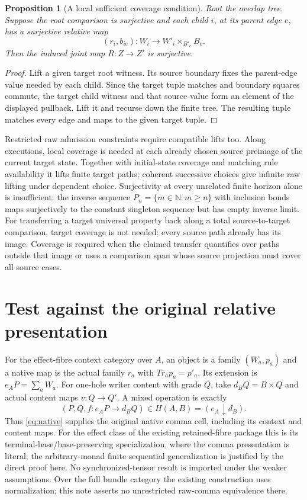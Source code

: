 \documentclass[11pt]{article}
\newtheorem{proposition}[theorem]{Proposition}
\begin{document}
\begin{proposition}[A local sufficient coverage condition]
Root the overlap tree. Suppose the root comparison is surjective and each child $i$, at its parent edge $e$, has a surjective relative map
\[
 (r_i,b_{ie}):W_i\longrightarrow W'_i\times_{B'_e}B_e.
\]
Then the induced joint map $R:Z\to Z'$ is surjective.
\end{proposition}
\begin{proof}
Lift a given target root witness. Its source boundary fixes the parent-edge value needed by each child. Since the target tuple matches and boundary squares commute, the target child witness and that source value form an element of the displayed pullback. Lift it and recurse down the finite tree. The resulting tuple matches every edge and maps to the given target tuple.
\end{proof}

Restricted raw admission constraints require compatible lifts too. Along executions, local coverage is needed at each already chosen source preimage of the current target state. Together with initial-state coverage and matching rule availability it lifts finite target paths; coherent successive choices give infinite raw lifting under dependent choice. Surjectivity at every unrelated finite horizon alone is insufficient: the inverse sequence $P_n=\{m\in\mathbb N:m\geq n\}$ with inclusion bonds maps surjectively to the constant singleton sequence but has empty inverse limit. For transferring a target universal property back along a total source-to-target comparison, target coverage is not needed; every source path already has its image. Coverage is required when the claimed transfer quantifies over paths outside that image or uses a comparison span whose source projection must cover all source cases.

\section{Test against the original relative presentation}

For the effect-fibre context category over $A$, an object is a family $(W_a,p_a)$ and a native map is the actual family $r_a$ with $Tr_a p_a=p'_a$. Its extension is $e_AP=\sum_aW_a$. For one-hole writer content with grade $Q$, take $d_BQ=B\times Q$ and actual content maps $v:Q\to Q'$. A mixed operation is exactly
\[
 (P,Q,f:e_AP\to d_BQ)\in H(A,B)=(e_A\downarrow d_B).
\]
Thus \eqref{eq:native} supplies the original native comma cell, including its context and content maps. For the effect class of the existing retained-fibre package this is its terminal-base/base-preserving specialization, where the comma presentation is literal; the arbitrary-monad finite sequential generalization is justified by the direct proof here. No synchronized-tensor result is imported under the weaker assumptions. Over the full bundle category the existing construction uses normalization; this note asserts no unrestricted raw-comma equivalence there.
\end{document}

